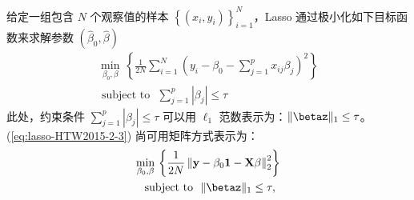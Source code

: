 给定一组包含 $N$ 个观察值的样本 $\left\{\left(x_{i}, y_{i}\right)\right\}_{i=1}^{N}$，Lasso 通过极小化如下目标函数来求解参数  $(\widehat{\beta}_{0}, \widehat{\beta})$ 
\begin{equation}\label{eq:lasso-HTW2015-2-3}%
	\begin{gathered}
\underset{\beta_{0}, \beta}{\operatorname{min}}\,
	\left\{\frac{1}{2 N} \sum_{i=1}^{N}\left(y_{i}-\beta_{0}-\sum_{j=1}^{p} x_{i j} \beta_{j}\right)^{2}\right\} \\
	\text { subject to } \,\, \sum_{j=1}^{p}\left|\beta_{j}\right| \leq \tau
	\end{gathered}
\end{equation}
此处，约束条件 $\sum_{j=1}^{p}\left|\beta_{j}\right| \leq \tau$ 可以用 $\ell_{1}$ 范数表示为：$\|\betaz\|_{1} \leq \tau$。(\ref{eq:lasso-HTW2015-2-3}) 尚可用矩阵方式表示为：
\begin{equation}\label{eq:lasso-HTW2015-2-4}
\begin{gathered}
\underset{\beta_{0}, \beta}{\operatorname{min}}\,
\left\{\frac{1}{2 N}\left\|\mathbf{y}-\beta_{0} \mathbf{1}-\mathbf{X} \beta\right\|_{2}^{2}\right\} \\
\text { subject to }\,\,\|\betaz\|_{1} \leq \tau,
\end{gathered}
\end{equation}

